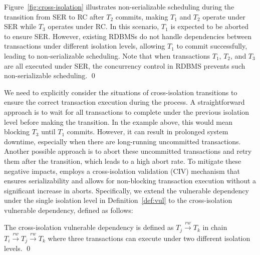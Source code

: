 \begin{example}
    \label{exa:cross-isolation}
    Figure~\ref{fig:cross-isolation} illustrates non-serializable scheduling during the transition from SER to RC after $T_2$ commits, making $T_1$ and $T_2$ operate under SER while $T_3$ operates under RC. In this scenario, $T_1$ is expected to be aborted to ensure SER. However, existing RDBMSs do not handle dependencies between transactions under different isolation levels, allowing $T_1$ to commit successfully, leading to non-serializable scheduling.
    Note that when transactions $T_1$, $T_2$, and $T_3$ are all executed under SER, the concurrency control in RDBMS prevents such non-serializable scheduling. 
    \qed
\end{example}


We need to explicitly consider the situations of cross-isolation transitions to ensure the correct transaction execution during the process. 
A straightforward approach is to wait for all transactions to complete under the previous isolation level before making the transition. In the example above, this would mean blocking $T_3$ until $T_1$ commits. 
However, it can result in prolonged system downtime, especially when there are long-running uncommitted transactions. Another possible approach is to abort these uncommitted transactions and retry them after the transition, which leads to a high abort rate. 
To mitigate these negative impacts, \sysname employs a cross-isolation validation (CIV) mechanism that ensures serializability and allows for non-blocking transaction execution without a significant increase in aborts. 
Specifically, we extend the vulnerable dependency under the single isolation level in Definition~\ref{def:vul} to the cross-isolation vulnerable dependency, defined as follows:
\begin{definition}
    \label{def:transition_vul}
    The cross-isolation vulnerable dependency is defined as $T_j \xrightarrow{rw} T_k $ in chain $T_i \xrightarrow{rw} T_j \xrightarrow{rw} T_k$ where three transactions {\color{blue} can execute} under two different isolation levels.
    \qed
\end{definition}

